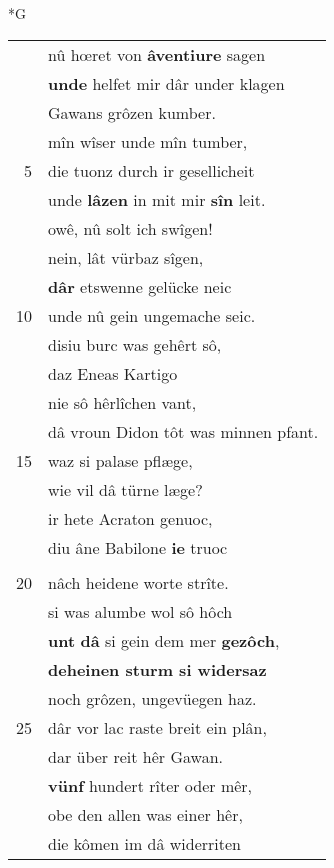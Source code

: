 \documentclass[8pt,a4paper,notitlepage]{article}
\begin{document}
\begin{table}[ht]
\begin{minipage}[t]{0.5\linewidth}
\small
\begin{center}*G
\end{center}
\begin{tabular}{rl}
 & nû hœret von \textbf{âventiure} sagen\\ 
 & \textbf{unde} helfet mir dâr under klagen\\ 
 & Gawans grôzen kumber.\\ 
 & mîn wîser unde mîn tumber,\\ 
5 & die tuonz durch ir gesellicheit\\ 
 & unde \textbf{lâzen} in mit mir \textbf{sîn} leit.\\ 
 & owê, nû solt ich swîgen!\\ 
 & nein, lât vürbaz sîgen,\\ 
 & \textbf{dâr} etswenne gelücke neic\\ 
10 & unde nû gein ungemache seic.\\ 
 & disiu burc was gehêrt sô,\\ 
 & daz Eneas Kartigo\\ 
 & nie sô hêrlîchen vant,\\ 
 & dâ vroun Didon tôt was minnen pfant.\\ 
15 & waz si palase pflæge,\\ 
 & wie vil dâ türne læge?\\ 
 & ir hete Acraton genuoc,\\ 
 & diu âne Babilone \textbf{ie} truoc\\ 
 & \textit{\begin{large}A\end{large}}nme griffe die \textbf{hœhesten} wîte\\ 
20 & nâch heidene worte strîte.\\ 
 & si was alumbe wol sô hôch\\ 
 & \textbf{unt} \textbf{dâ} si gein dem mer \textbf{gezôch},\\ 
 & \textbf{deheinen sturm si widersaz}\\ 
 & noch grôzen, ungevüegen haz.\\ 
25 & dâr vor lac raste breit ein plân,\\ 
 & dar über reit hêr Gawan.\\ 
 & \textbf{vünf} hundert rîter oder mêr,\\ 
 & obe den allen was einer hêr,\\ 
 & die kômen im dâ widerriten\\ 

\end{tabular}
\end{minipage}
\end{table}
\end{document}
